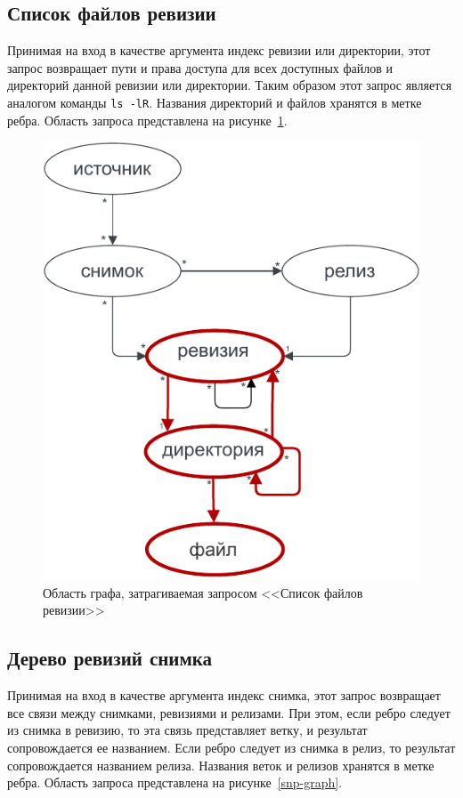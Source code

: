\documentclass[times,specification,annotation]{itmo-student-thesis}
\begin{document}
\subsection{Список файлов ревизии}

Принимая на вход в качестве аргумента индекс ревизии или директории, этот запрос возвращает пути и права доступа для всех доступных файлов и директорий данной ревизии или директории. Таким образом этот запрос является аналогом команды \texttt{ls -lR}. Названия директорий и файлов хранятся в метке ребра. Область запроса представлена на рисунке~\ref{rec-graph}.

\begin{figure}[!h]
\caption{Область графа, затрагиваемая запросом <<Список файлов ревизии>>}\label{rec-graph}
\centering
\includegraphics{img/rec-graph.pdf}
\end{figure}

\subsection{Дерево ревизий снимка}

Принимая на вход в качестве аргумента индекс снимка, этот запрос возвращает все связи между снимками, ревизиями и релизами. При этом, если ребро следует из снимка в ревизию, то эта связь представляет ветку, и результат сопровождается ее названием. Если ребро следует из снимка в релиз, то результат сопровождается названием релиза. Названия веток и релизов хранятся в метке ребра. Область запроса представлена на рисунке~\ref{snp-graph}.
\end{document}
